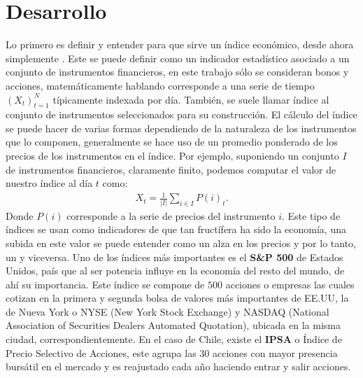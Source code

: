 \documentclass{article}
\begin{document}
\section{Desarrollo}
    Lo primero es definir y entender para que sirve un índice económico, desde ahora simplemente . Este se puede definir como un indicador estadístico asociado a un conjunto de instrumentos financieros, en este trabajo sólo se consideran bonos y acciones, matemáticamente hablando corresponde a una serie de tiempo $(X_t)_{t=1}^{N}$ típicamente indexada por día. También, se suele llamar índice al conjunto de instrumentos seleccionados para su construcción. El cálculo del índice se puede hacer de varias formas dependiendo de la naturaleza de los instrumentos que lo componen, generalmente se hace uso de un promedio ponderado de los precios de los instrumentos en el índice. Por ejemplo, suponiendo un conjunto $I$ de instrumentos financieros, claramente finito, podemos computar el valor de nuestro índice al día $t$ como:
    \begin{align*}
    	X_t = \frac{1}{|I|}\sum_{i \in I} P(i)_t.
    \end{align*}
   	Donde $P(i)$ corresponde a la serie de precios del instrumento $i$. Este tipo de índices se usan como indicadores de que tan fructífera ha sido la economía, una subida en este valor se puede entender como un alza en los precios y por lo tanto, un  y viceversa. Uno de los índices más importantes es el \textbf{S\&}\textbf{P 500} de Estados Unidos, país que al ser potencia influye en la economía del resto del mundo, de ahí su importancia. Este índice se compone de $500$ acciones o empresas las cuales cotizan en la primera y segunda bolsa de valores más importantes de EE.UU, la de Nueva York o NYSE (New York Stock Exchange) y NASDAQ (National Association of Securities Dealers Automated Quotation), ubicada en la misma ciudad, correspondientemente. En el caso de Chile, existe el \textbf{IPSA} o Índice de Precio Selectivo de Acciones, este agrupa las $30$ acciones con mayor presencia bursátil en el mercado y es reajustado cada año haciendo entrar y salir acciones.
\end{document}
